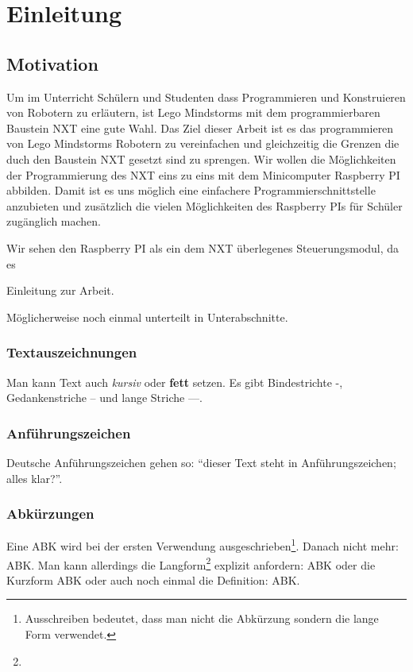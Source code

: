 \chapter{Einleitung}

\section{Motivation}
Um im Unterricht Schülern und Studenten dass Programmieren und Konstruieren von Robotern zu erläutern, ist Lego Mindstorms mit dem programmierbaren Baustein NXT eine gute Wahl. Das Ziel dieser Arbeit ist es das programmieren von Lego Mindstorms Robotern zu vereinfachen und gleichzeitig die Grenzen die duch den Baustein NXT gesetzt sind zu sprengen. Wir wollen die Möglichkeiten der Programmierung des NXT eins zu eins mit dem Minicomputer Raspberry PI abbilden. Damit ist es uns möglich eine einfachere Programmierschnittstelle anzubieten und zusätzlich die vielen Möglichkeiten des Raspberry PIs für Schüler zugänglich machen. 

Wir sehen den Raspberry PI als ein dem NXT überlegenes Steuerungsmodul, da es


Einleitung zur Arbeit.

Möglicherweise noch einmal unterteilt in Unterabschnitte.

\subsection{Textauszeichnungen}
\label{Einleitung:Textauszeichnungen}

Man kann Text auch \textit{kursiv} oder \textbf{fett} setzen. Es gibt Bindestrichte -, Gedankenstriche -- und lange Striche ---.


\subsection{Anführungszeichen}

Deutsche Anführungszeichen gehen so: "`dieser Text steht in \glq Anführungszeichen\grq; alles klar?"'.


\subsection{Abkürzungen}

Eine \ac{ABK} wird bei der ersten Verwendung ausgeschrieben\footnote{Ausschreiben bedeutet, dass man nicht die Abkürzung sondern die lange Form verwendet.}. Danach nicht mehr: \ac{ABK}. Man kann allerdings die Langform\footnote{\blindtext} explizit anfordern: \acl{ABK} oder die Kurzform \acs{ABK} oder auch noch einmal die Definition: \acf{ABK}.

